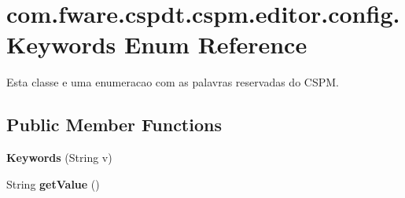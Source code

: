 \hypertarget{enumcom_1_1fware_1_1cspdt_1_1cspm_1_1editor_1_1config_1_1_keywords}{}\section{com.\+fware.\+cspdt.\+cspm.\+editor.\+config.\+Keywords Enum Reference}
\label{enumcom_1_1fware_1_1cspdt_1_1cspm_1_1editor_1_1config_1_1_keywords}


Esta classe e uma enumeracao com as palavras reservadas do C\+S\+PM.  


\subsection*{Public Member Functions}
\begin{DoxyCompactItemize}
\item 
\mbox{\label{enumcom_1_1fware_1_1cspdt_1_1cspm_1_1editor_1_1config_1_1_keywords_a9773a880667143eaffa32d850f887b15}} 
{\bfseries Keywords} (String v)
\item 
\mbox{\label{enumcom_1_1fware_1_1cspdt_1_1cspm_1_1editor_1_1config_1_1_keywords_afa5f52efa871dcff12de993e917d6e00}} 
String {\bfseries get\+Value} ()
\end{DoxyCompactItemize}
